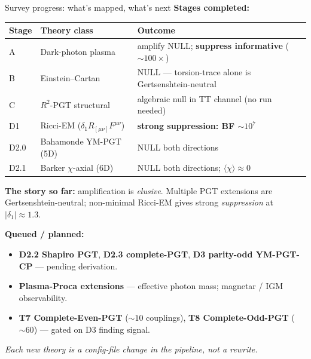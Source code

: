 \begin{frame}{Survey progress: what's mapped, what's next}
  \textbf{Stages completed:}
  {\renewcommand{\arraystretch}{0.82}
  \begin{center}\scriptsize
    \begin{tabular}{lll}
      \toprule
      Stage & Theory class & Outcome \\
      \midrule
      A    & Dark-photon plasma           & amplify NULL; \textbf{suppress informative} ($\sim\!100\times$) \\
      B    & Einstein--Cartan             & NULL --- torsion-trace alone is Gertsenshtein-neutral \\
      C    & $R^2$-PGT structural         & algebraic null in TT channel (no run needed) \\
      D1   & Ricci-EM ($\delta_1 R_{[\mu\nu]}F^{\mu\nu}$) & \textbf{strong suppression: BF $\sim\!10^7$} \\
      D2.0 & Bahamonde YM-PGT (5D)        & NULL both directions \\
      D2.1 & Barker $\chi$-axial (6D)     & NULL both directions; $\langle\chi\rangle \approx 0$ \\
      \bottomrule
    \end{tabular}
  \end{center}}

  \vspace{0.2em}
  \textbf{The story so far:} amplification is \emph{elusive}. Multiple PGT extensions are Gertsenshtein-neutral; non-minimal Ricci-EM gives strong \emph{suppression} at $|\delta_1|\!\approx\!1.3$.

  \vspace{0.15em}
  \textbf{Queued / planned:}
  \begin{itemize}\scriptsize
    \item \textbf{D2.2 Shapiro PGT}, \textbf{D2.3 complete-PGT}, \textbf{D3 parity-odd YM-PGT-CP} --- pending derivation.
    \item \textbf{Plasma-Proca extensions} --- effective photon mass; magnetar / IGM observability.
    \item \textbf{T7 Complete-Even-PGT} ($\sim\!10$ couplings), \textbf{T8 Complete-Odd-PGT} ($\sim\!60$) --- gated on D3 finding signal.
  \end{itemize}
  \emph{Each new theory is a config-file change in the pipeline, not a rewrite.}
\end{frame}
